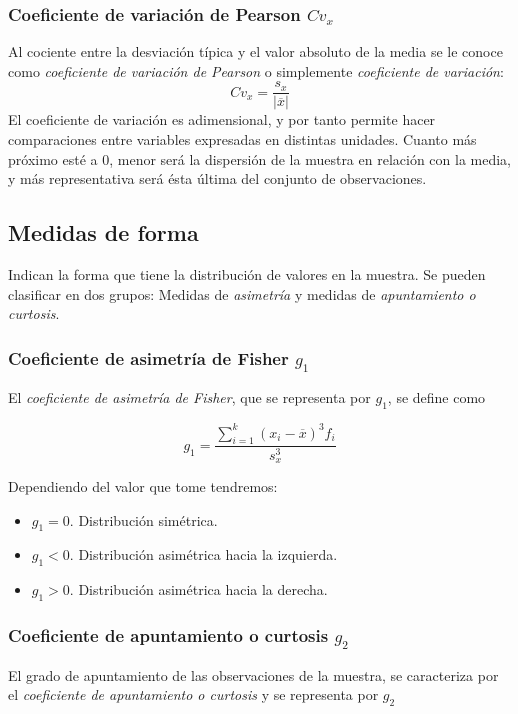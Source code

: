 \subsubsection{Coeficiente de variación de Pearson $\textit{Cv}_\textit{x}$}
Al cociente entre la desviación típica y el valor absoluto de la
media se le conoce como \emph{coeficiente de variación de Pearson} o
simplemente \emph{coeficiente de variación}:
\[ Cv_x=\frac{s_x}{|\overline{x}|}\]
 El coeficiente de variación es adimensional, y por tanto
permite hacer comparaciones entre variables expresadas en distintas
unidades. Cuanto más próximo esté a 0, menor será la dispersión de
la muestra en relación con la media, y más representativa será ésta
última del conjunto de observaciones.

\subsection{Medidas de forma}
Indican la forma que tiene la distribución de valores en la muestra.
Se pueden clasificar en dos grupos: Medidas de \emph{asimetría}
y medidas de \emph{apuntamiento o curtosis}.

\subsubsection{Coeficiente de asimetría de Fisher $\textit{g}_\textit{1}$}
El \emph{coeficiente de asimetría de Fisher}, que se representa por $g_1$, se define como

\[g_1=\frac{\sum_{i=1}^{k}(x_i-\overline{x})^{3}f_i}{s_x^{3}}\]

Dependiendo del valor que tome tendremos:

\begin{itemize}
  \item  $g_1=0$. Distribución simétrica.
  \item $g_1<0$. Distribución asimétrica hacia la izquierda.
  \item $g_1>0$. Distribución asimétrica hacia la derecha.
\end{itemize}

\subsubsection{Coeficiente de apuntamiento o curtosis $\textit{g}_\textit{2}$}
El grado de apuntamiento de las observaciones de la muestra, se
caracteriza por el \emph{coeficiente de apuntamiento o curtosis} y
se representa por $g_2$


